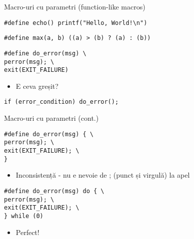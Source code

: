 \documentclass{beamer}
\begin{document}
\begin{frame}{Macro-uri cu parametri (function-like macros)}
			\begin{beamerboxesrounded}[lower=block body,shadow=true]{}
\texttt{\#define echo()  printf("Hello, World!\textbackslash{}n")}
			\end{beamerboxesrounded}
			\begin{beamerboxesrounded}[lower=block body,shadow=true]{}
\texttt{\#define max(a, b)   ((a) \textgreater{} (b) ? (a) : (b))}
			\end{beamerboxesrounded}
			\begin{beamerboxesrounded}[lower=block body,shadow=true]{}
\texttt{\#define do\_error(msg) \textbackslash{} \\
\hlstd{}\hlstd{\ \ \ \ \ \ \ \ }\hlstd{}perror(msg);	\textbackslash{} \\
\hlstd{}\hlstd{\ \ \ \ \ \ \ \ }\hlstd{}exit(EXIT\_FAILURE)
	}
			\end{beamerboxesrounded}
	\begin{itemize}
		\item E ceva greșit?
	\end{itemize}
			\begin{beamerboxesrounded}[lower=block body,shadow=true]{}
\texttt{if (error\_condition) do\_error();}
			\end{beamerboxesrounded}
\end{frame}

\begin{frame}{Macro-uri cu parametri (cont.)}
			\begin{beamerboxesrounded}[lower=block body,shadow=true]{}
\texttt{\#define do\_error(msg) \{ \textbackslash{} \\
\hlstd{}\hlstd{\ \ \ \ \ \ \ \ }\hlstd{}perror(msg);	\textbackslash{} \\
\hlstd{}\hlstd{\ \ \ \ \ \ \ \ }\hlstd{}exit(EXIT\_FAILURE); \textbackslash{} \\
\}
	}
			\end{beamerboxesrounded}
	\begin{itemize}
		\item Inconsistență - nu e nevoie de ; (punct și virgulă) la apel
	\end{itemize}
			\begin{beamerboxesrounded}[lower=block body,shadow=true]{}
\texttt{\#define do\_error(msg) do \{ \textbackslash{} \\
\hlstd{}\hlstd{\ \ \ \ \ \ \ \ }\hlstd{}perror(msg);	\textbackslash{} \\
\hlstd{}\hlstd{\ \ \ \ \ \ \ \ }\hlstd{}exit(EXIT\_FAILURE); \textbackslash{} \\
\} while (0)
	}
			\end{beamerboxesrounded}
	\begin{itemize}
		\item Perfect!
	\end{itemize}
\end{frame}
\end{document}
